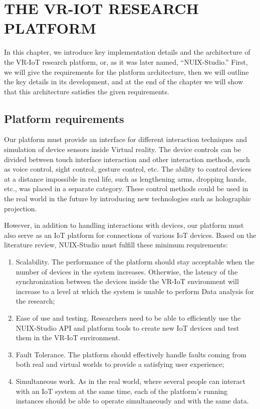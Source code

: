 
\chapter{\MakeUppercase{The VR-IoT Research Platform}}

In this chapter, we introduce key implementation details and the architecture of the VR-IoT research platform, or, as it was later named, ``NUIX-Studio.'' First, we will give the requirements for the platform architecture, then we will outline the key details in its development, and at the end of the chapter we will show that this architecture satisfies the given requirements. 

\section{Platform requirements}

Our platform must provide an interface for different interaction techniques and simulation of device sensors inside Virtual reality. The device controls can be divided between touch interface interaction and other interaction methods, such as voice control, sight control, gesture control, etc. The ability to control devices at a distance impossible in real life, such as lengthening arms, dropping hands, etc., was placed in a separate category. These control methods could be used in the real world in the future by introducing new technologies such as holographic projection. 

However, in addition to handling interactions with devices, our platform must also serve as an IoT platform for connections of various IoT devices. Based on the literature review, NUIX-Studio must fulfill these minimum requirements:
\begin{enumerate}
\item Scalability. The performance of the platform should stay acceptable when the number of devices in the system increases. Otherwise, the latency of the synchronization between the devices inside the VR-IoT environment will increase to a level at which the system is unable to perform Data analysis for the research;
\item Ease of use and testing. Researchers need to be able to efficiently use the NUIX-Studio API and platform tools to create new IoT devices and test them in the VR-IoT environment.
\item Fault Tolerance. The platform should effectively handle faults coming from both real and virtual worlds to provide a satisfying user experience;
\item Simultaneous work. As in the real world, where several people can interact with an IoT system at the same time, each of the platform's running instances should be able to operate simultaneously and with the same data.
\end{enumerate}

